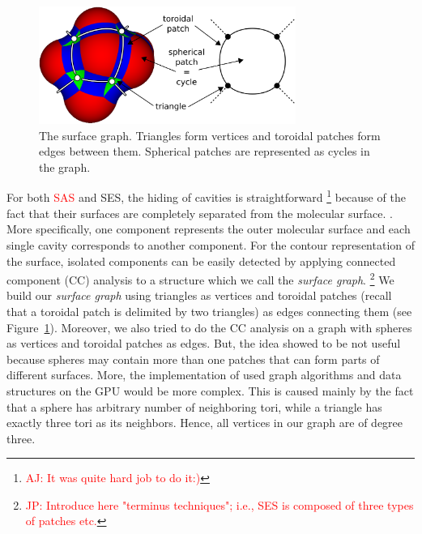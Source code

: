
\begin{figure}[htb]
  \centering
  \includegraphics[width=3.3in]{image/graph.png}
  \caption{The surface graph.
	Triangles form vertices and toroidal patches form edges between them.
	Spherical patches are represented as cycles in the graph.}
	\label{fig:graph}
\end{figure}

For both \textcolor{red}{SAS} and SES, the hiding of cavities is straightforward \footnote{\textcolor{red}{AJ: It was quite hard job to do it:)}} because of the fact that their surfaces are completely separated from the molecular surface. \textcolor{red}{\cite{borland2011ambient}}.
More specifically, one component represents the outer molecular surface and each single cavity corresponds to another component.
For the contour representation of the surface, isolated components can be easily detected by applying connected component (CC) analysis to a structure which we call the \textit{surface graph}.
\footnote{\textcolor{red}{JP: Introduce here "terminus techniques"; i.e., SES is composed of three types of patches etc.}}
We build our \textit{surface graph} using triangles as vertices and toroidal patches (recall that a toroidal patch is delimited by two triangles) as edges connecting them (see Figure~\ref{fig:graph}).
Moreover, we also tried to do the CC analysis on a graph with spheres as vertices and toroidal patches as edges.
But, the idea showed to be not useful because spheres may contain more than one patches that can form parts of different surfaces.
More, the implementation of used graph algorithms and data structures on the GPU would be more complex.
This is caused mainly by the fact that a sphere has arbitrary number of neighboring tori, while a triangle has exactly three tori as its neighbors.
Hence, all vertices in our graph are of degree three.

